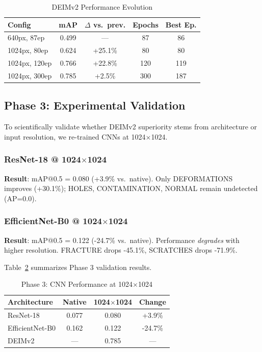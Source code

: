 \documentclass[journal,twoside,web]{ieeecolor}
\begin{document}
\begin{table}[htbp]
\centering
\caption{DEIMv2 Performance Evolution}
\label{tab:phase2_evolution}
\begin{tabular}{lcccc}
\toprule
\textbf{Config} & \textbf{mAP} & \textbf{$\Delta$ vs.\ prev.} & \textbf{Epochs} & \textbf{Best Ep.} \\
\midrule
640px, 87ep & 0.499 & --- & 87 & 86 \\
1024px, 80ep & 0.624 & +25.1\% & 80 & 80 \\
1024px, 120ep & 0.766 & +22.8\% & 120 & 119 \\
1024px, 300ep & 0.785 & +2.5\% & 300 & 187 \\
\bottomrule
\end{tabular}
\end{table}

\subsection{Phase 3: Experimental Validation}

To scientifically validate whether DEIMv2 superiority stems from architecture or input resolution, we re-trained CNNs at 1024$\times$1024.

\subsubsection{ResNet-18 @ 1024$\times$1024}
\textbf{Result}: mAP@0.5 = 0.080 (+3.9\% vs.\ native). Only DEFORMATIONS improves (+30.1\%); HOLES, CONTAMINATION, NORMAL remain undetected (AP=0.0).

\subsubsection{EfficientNet-B0 @ 1024$\times$1024}
\textbf{Result}: mAP@0.5 = 0.122 (-24.7\% vs.\ native). Performance \textit{degrades} with higher resolution. FRACTURE drops -45.1\%, SCRATCHES drops -71.9\%.

Table~\ref{tab:phase3} summarizes Phase 3 validation results.

\begin{table}[htbp]
\centering
\caption{Phase 3: CNN Performance at 1024$\times$1024}
\label{tab:phase3}
\begin{tabular}{lccc}
\toprule
\textbf{Architecture} & \textbf{Native} & \textbf{1024$\times$1024} & \textbf{Change} \\
\midrule
ResNet-18 & 0.077 & 0.080 & +3.9\% \\
EfficientNet-B0 & 0.162 & 0.122 & -24.7\% \\
DEIMv2 & --- & 0.785 & --- \\
\bottomrule
\end{tabular}
\end{table}
\end{document}
